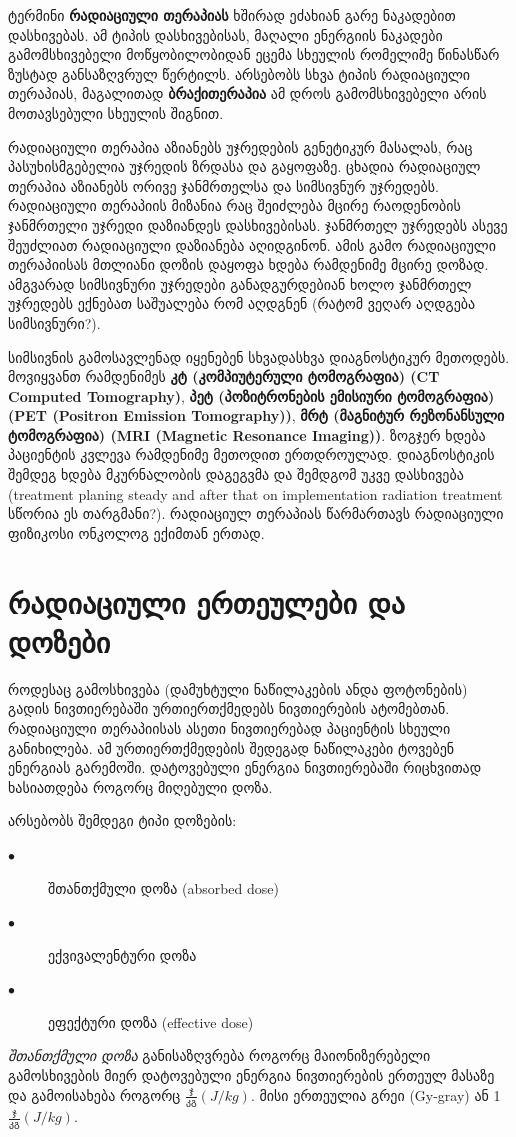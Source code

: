 \documentclass[12pt,a4paper,]{report}
\begin{document}
ტერმინი \textbf{რადიაციული თერაპიას} ხშირად ეძახიან  გარე ნაკადებით დასხივებას. ამ ტიპის დასხივებისას, მაღალი ენერგიის ნაკადები გამომსხივებელი მოწყობილობიდან ეცემა სხეულის რომელიმე წინასწარ ზუსტად განსაზღვრულ წერტილს. არსებობს სხვა ტიპის რადიაციული თერაპიას, მაგალითად \textbf{ბრაქითერაპია}\cite{brachytherapy} ამ დროს გამომსხივებელი არის მოთავსებული სხეულის შიგნით. 

რადიაციული თერაპია აზიანებს უჯრედების გენეტიკურ მასალას, რაც პასუხისმგებელია უჯრედის ზრდასა და გაყოფაზე. ცხადია რადიაციულ თერაპია აზიანებს ორივე ჯანმრთელსა და სიმსივნურ უჯრედებს. რადიაციული თერაპიის მიზანია რაც შეიძლება მცირე რაოდენობის ჯანმრთელი უჯრედი დაზიანდეს დასხივებისას. ჯანმრთელ უჯრედებს ასევე შეუძლიათ რადიაციული დაზიანება აღიდგინონ. ამის გამო რადიაციული თერაპიისას მთლიანი დოზის დაყოფა ხდება რამდენიმე მცირე დოზად. ამგვარად სიმსივნური უჯრედები განადგურდებიან ხოლო ჯანმრთელ უჯრედებს ექნებათ საშუალება რომ აღდგნენ (რატომ ვეღარ აღდგება სიმსივნური?). 

სიმსივნის გამოსავლენად იყენებენ სხვადასხვა დიაგნოსტიკურ მეთოდებს. მოვიყვანთ რამდენიმეს \textbf{კტ (კომპიუტერული ტომოგრაფია) (CT Computed Tomography)}, \textbf{პეტ (პოზიტრონების ემისიური ტომოგრაფია) (PET (Positron Emission Tomography))}, \textbf{მრტ (მაგნიტურ რეზონანსული ტომოგრაფია) (MRI (Magnetic Resonance Imaging))}. ზოგჯერ ხდება პაციენტის კვლევა რამდენიმე მეთოდით ერთდროულად. დიაგნოსტიკის შემდეგ ხდება მკურნალობის დაგეგვმა და შემდგომ უკვე დასხივება (treatment planing steady and after that on implementation radiation treatment სწორია ეს თარგმანი?). რადიაციულ თერაპიას წარმართავს რადიაციული ფიზიკოსი ონკოლოგ ექიმთან ერთად. 

\section{რადიაციული ერთეულები და დოზები}
როდესაც გამოსხივება (დამუხტული ნაწილაკების ანდა ფოტონების) გადის ნივთიერებაში ურთიერთქმედებს ნივთიერების ატომებთან. რადიაციული თერაპიისას ასეთი ნივთიერებად პაციენტის სხეული განიხილება. ამ ურთიერთქმედების შედეგად ნაწილაკები ტოვებენ ენერგიას გარემოში. დატოვებული ენერგია ნივთიერებაში რიცხვითად ხასიათდება როგორც მიღებული დოზა. 

	არსებობს შემდეგი ტიპი დოზების:
	\begin{description}
      \item[$\bullet$] შთანთქმული დოზა  (absorbed dose)
      \item[$\bullet$] ექვივალენტური დოზა
      \item[$\bullet$] ეფექტური დოზა (effective dose)
    \end{description}
\textit{შთანთქმული დოზა} განისაზღვრება როგორც მაიონიზერებელი გამოსხივების მიერ დატოვებული ენერგია ნივთიერების ერთეულ მასაზე და გამოისახება როგორც $\frac{\text{ჯ}}{\text{კგ}} (J/kg)$. მისი ერთეულია გრეი (Gy-gray) ან 1$\frac{\text{ჯ}}{\text{კგ}} (J/kg)$.
\end{document}
